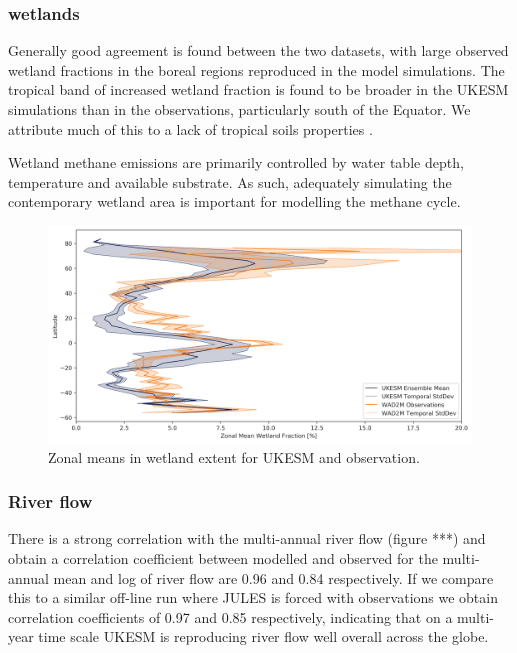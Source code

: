 \subsubsection{wetlands}
Generally good agreement is found between the two datasets, with large observed wetland fractions in the boreal regions reproduced in the model simulations. The tropical band of increased wetland fraction is found to be broader in the UKESM simulations than in the observations, particularly south of the Equator. We attribute much of this to a lack of tropical soils properties \citep{Gedney2019}.

Wetland methane emissions are primarily controlled by water table depth, temperature and available substrate. As such, adequately simulating the contemporary wetland area is important for modelling the methane cycle.  

\begin{figure}[t]
    \includegraphics[width=16cm]{figs/Wetland.png}
    \caption{Zonal means in wetland extent for UKESM and observation.  \label{fig:wetland} }
\end{figure}

\subsubsection{River flow}
There is a strong correlation with the multi-annual river flow (figure ***)  and obtain a correlation coefficient between modelled and observed for the multi-annual mean and log of river flow are 0.96 and 0.84 respectively. If we compare this to a similar off-line run where JULES is forced with observations we obtain correlation coefficients of 0.97 and 0.85 respectively, indicating that on a multi-year time scale UKESM is reproducing river flow well overall across the globe.
